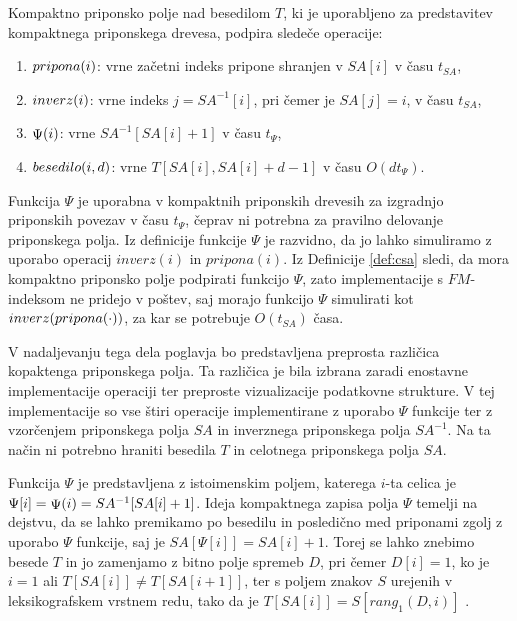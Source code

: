 \begin{defi}\label{def:csa}
     Kompaktno priponsko polje nad besedilom $T$, ki je uporabljeno za predstavitev kompaktnega priponskega drevesa, podpira sledeče operacije:
    \begin{enumerate}
        \item $ \mathop{pripona}(i) $: vrne začetni indeks pripone shranjen v $SA[i]$ v času $t_{SA}$,
        \item $ \mathop{inverz}(i) $: vrne indeks $j=SA^{-1}[i]$, pri čemer je $SA[j]=i$, v času $t_{SA}$,
        \item $ \mathop{\Psi}(i) $: vrne $SA^{-1}[SA[i]+1]$ v času $t_\Psi$,
        \item $ \mathop{besedilo}(i,d) $: vrne $T[SA[i],SA[i]+d-1]$ v času $O(dt_\Psi)$.
    \end{enumerate}    
\end{defi}

Funkcija $\Psi$ je uporabna v kompaktnih priponskih drevesih za izgradnjo priponskih povezav v času $t_\Psi$, čeprav ni potrebna za pravilno delovanje priponskega polja. Iz definicije funkcije $\Psi$ je razvidno, da jo lahko simuliramo z uporabo operacij $inverz(i)$ in $pripona(i)$. Iz Definicije \ref{def:csa} sledi, da mora kompaktno priponsko polje podpirati funkcijo $\Psi$, zato implementacije s $FM$-indeksom ne pridejo v poštev, saj morajo funkcijo $\Psi$ simulirati kot $ \mathop{inverz}( \mathop{pripona}(\cdot) ) $, za kar se potrebuje $O(t_{SA})$ časa.

V nadaljevanju tega dela poglavja bo predstavljena preprosta različica kopaktenga priponskega polja. Ta različica je bila izbrana zaradi enostavne implementacije operaciji ter preproste vizualizacije podatkovne strukture. V tej implementacije so vse štiri operacije implementirane z uporabo $\Psi$ funkcije ter z vzorčenjem priponskega polja $SA$ in inverznega priponskega polja $SA^{-1}$. Na ta način ni potrebno hraniti besedila $T$ in celotnega priponskega polja $SA$.

Funkcija $\Psi$ je predstavljena z istoimenskim poljem, katerega $i$-ta celica je $\Psi[i]= \mathop{\Psi}(i) =SA^{-1}[SA[i]+1]$. Ideja kompaktnega zapisa polja $\Psi$ temelji na dejstvu, da se lahko premikamo po besedilu in posledično med priponami zgolj z uporabo $\Psi$ funkcije, saj je $SA[\Psi[i]]=SA[i]+1$. Torej se lahko znebimo besede $T$ in jo zamenjamo z bitno polje spremeb $D$, pri čemer $D[i]=1$, ko je $i=1$ ali $T[SA[i]]\ne T[SA[i+1]]$, ter s poljem znakov $S$ urejenih v leksikografskem vrstnem redu, tako da je $T[SA[i]]=S[rang_1(D,i)]$ \cite{Navarro2016}.


